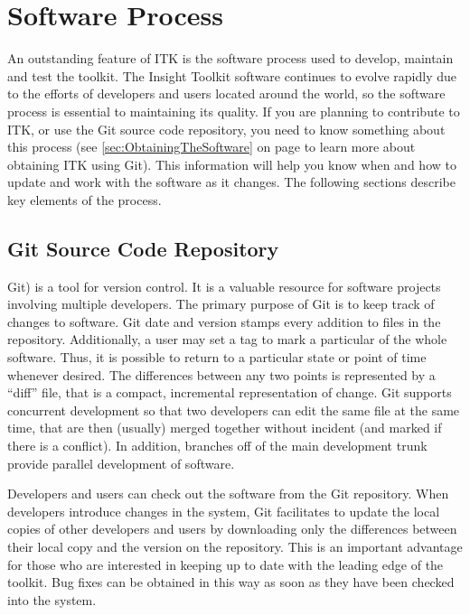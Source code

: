 \chapter{Software Process}
\label{chapter:SoftwareProcess}

An outstanding feature of ITK is the software process used to develop,
maintain and test the toolkit. The Insight Toolkit software continues to
evolve rapidly due to the efforts of developers and users located around the
world, so the software process is essential to maintaining its quality. If
you are planning to contribute to ITK, or use the Git source code repository,
you need to know something about this process (see
\ref{sec:ObtainingTheSoftware} on page \pageref{sec:ObtainingTheSoftware} to
learn more about obtaining ITK using Git). This information will help you
know when and how to update and work with the software as it changes. The
following sections describe key elements of the process.

\section{Git Source Code Repository}
\label{sec:GitRepository}


Git) is a tool for version control. It is a valuable resource for
software projects involving multiple developers.  The primary purpose
of Git is to keep track of changes to software. Git date and version
stamps every addition to files in the repository. Additionally, a user
may set a tag to mark a particular of the whole software. Thus, it is
possible to return to a particular state or point of time whenever
desired. The differences between any two points is represented by a
``diff'' file, that is a compact, incremental representation of
change. Git supports concurrent development so that two developers can
edit the same file at the same time, that are then (usually) merged
together without incident (and marked if there is a conflict). In
addition, branches off of the main development trunk provide parallel
development of software.

Developers and users can check out the software from the Git repository. When
developers introduce changes in the system,  Git facilitates to update the
local copies of other developers and users by downloading only the differences
between their local copy and the version on the repository.  This is an
important advantage for those who are interested in keeping up to date with the
leading edge of the toolkit. Bug fixes can be obtained in this way as soon as
they have been checked into the system.


